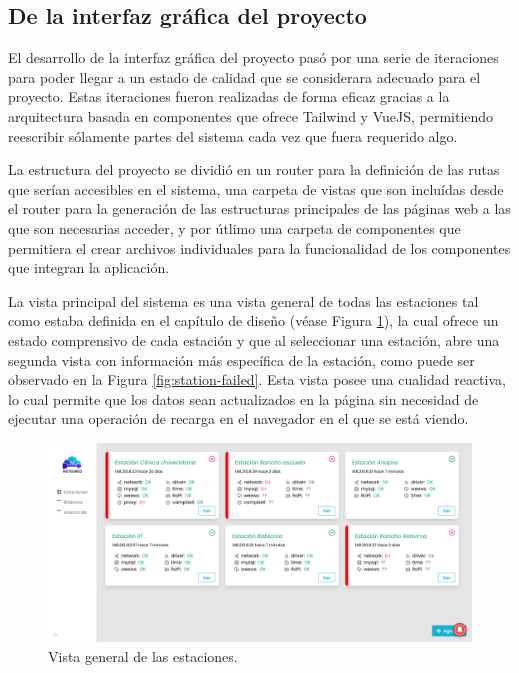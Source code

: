 \subsection{De la interfaz gráfica del proyecto}

El desarrollo de la interfaz gráfica del proyecto pasó por una serie de iteraciones para poder llegar a un estado de calidad que se considerara adecuado para el proyecto. Estas iteraciones fueron realizadas de forma eficaz gracias a la arquitectura basada en componentes que ofrece Tailwind y VueJS, permitiendo reescribir sólamente partes del sistema cada vez que fuera requerido algo.

La estructura del proyecto se dividió en un router para la definición de las rutas que serían accesibles en el sistema, una carpeta de vistas que son incluídas desde el router para la generación de las estructuras principales de las páginas web a las que son necesarias acceder, y por útlimo una carpeta de componentes que permitiera el crear archivos individuales para la funcionalidad de los componentes que integran la aplicación.

La vista principal del sistema es una vista general de todas las estaciones tal como estaba definida en el capítulo de diseño (véase Figura \ref{fig:dashboard}), la cual ofrece un estado comprensivo de cada estación y que al seleccionar una estación, abre una segunda vista con información más específica de la estación, como puede ser observado en la Figura \ref{fig:station-failed}. Esta vista posee una cualidad reactiva, lo cual permite que los datos sean actualizados en la página sin necesidad de ejecutar una operación de recarga en el navegador en el que se está viendo.

\begin{figure}[!ht]
	\centering
	\includegraphics[width=1\linewidth]{images/screenshots/0.0.0-dashboard.png}
	\caption{Vista general de las estaciones.}
	\label{fig:dashboard}
\end{figure}

